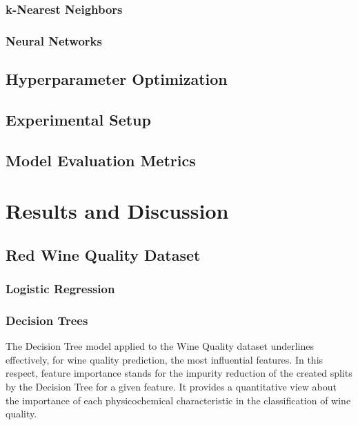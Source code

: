 \documentclass[conference]{IEEEtran}
\begin{document}
\subsubsection{k-Nearest Neighbors}
\subsubsection{Neural Networks}

\subsection{Hyperparameter Optimization}

\subsection{Experimental Setup}
\subsection{Model Evaluation Metrics}


\section{Results and Discussion}
\subsection{Red Wine Quality Dataset}
\subsubsection{Logistic Regression}
\subsubsection{Decision Trees} The Decision Tree model applied to the Wine Quality dataset underlines effectively, for wine quality prediction, the most influential features. In this respect, feature importance stands for the impurity reduction of the created splits by the Decision Tree for a given feature. It provides a quantitative view about the importance of each physicochemical characteristic in the classification of wine quality.
\end{document}
